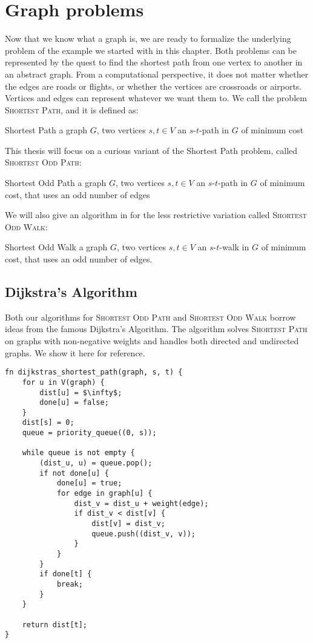 \section{Graph problems}
\label{section:graph-problems}

Now that we know what a graph is, we are ready to formalize the underlying problem of the example we started with in this chapter. Both problems can be represented by the quest to find the shortest path from one vertex to another in an abstract graph. From a computational perspective, it does not matter whether the edges are roads or flights, or whether the vertices are crossroads or airports. Vertices and edges can represent whatever we want them to. We call the problem \textsc{Shortest Path}, and it is defined as:

\problem
{Shortest Path}
{a graph $G$, two vertices $s,t \in V$}
{an $s$-$t$-path in $G$ of minimum cost}

This thesis will focus on a curious variant of the Shortest Path problem, called \textsc{Shortest Odd Path}:

\problem
{Shortest Odd Path}
{a graph $G$, two vertices $s,t \in V$}
{an $s$-$t$-path in $G$ of minimum cost, that uses an odd number of edges}

We will also give an algorithm in  for the less restrictive variation called \textsc{Shortest Odd Walk}:

\problem
{Shortest Odd Walk}
{a graph $G$, two vertices $s,t \in V$}
{an $s$-$t$-walk in $G$ of minimum cost, that uses an odd number of edges.}

\subsection*{Dijkstra's Algorithm}
\label{algorithm:dijkstras-algorithm}
Both our algorithms for \textsc{Shortest Odd Path} and \textsc{Shortest Odd Walk} borrow ideas from the famous Dijkstra's Algorithm. The algorithm solves \textsc{Shortest Path} on graphs with non-negative weights and handles both directed and undirected graphs. We show it here for reference.

\begin{lstlisting}[caption={Dijkstra's Algorithm for Shortest Path},label=Listing,mathescape=true]
fn dijkstras_shortest_path(graph, s, t) {
    for u in V(graph) {
        dist[u] = $\infty$;
        done[u] = false;
    }
    dist[s] = 0;
    queue = priority_queue((0, s));

    while queue is not empty {
        (dist_u, u) = queue.pop();
        if not done[u] {
            done[u] = true;
            for edge in graph[u] {
                dist_v = dist_u + weight(edge);
                if dist_v < dist[v] {
                    dist[v] = dist_v;
                    queue.push((dist_v, v));
                }
            }
        }
        if done[t] { 
            break; 
        }
    }

    return dist[t];
}
\end{lstlisting}
